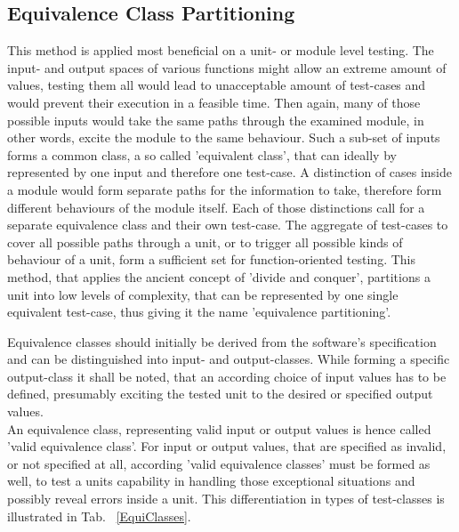 	\subsection{Equivalence Class Partitioning}
	This method is applied most beneficial on a unit- or module level testing. The input- and output spaces of various functions might allow an extreme amount of values, testing them all would lead to unacceptable amount of test-cases and would prevent their execution in a feasible time. Then again, many of those possible inputs would take the same paths through the examined module, in other words, excite the module to the same behaviour. Such a sub-set of inputs forms a common class, a so called 'equivalent class', that can ideally by represented by one input and therefore one test-case. A distinction of cases inside a module would form separate paths for the information to take, therefore form different behaviours of the module itself. Each of those distinctions call for a separate equivalence class and their own test-case. The aggregate of test-cases to cover all possible paths through a unit, or to trigger all possible kinds of behaviour of a unit, form a sufficient set for function-oriented testing. This method, that applies the ancient concept of 'divide and conquer', partitions a unit into low levels of complexity, that can be represented by one single equivalent test-case, thus giving it the name 'equivalence partitioning'.

	Equivalence classes should initially be derived from the software's specification and can be distinguished into input- and output-classes. While forming a specific output-class it shall be noted, that an according choice of input values has to be defined, presumably exciting the tested unit to the desired or specified output values. \\
	An equivalence class, representing valid input or output values is hence called 'valid equivalence class'. For input or output values, that are specified as invalid, or not specified at all, according 'valid equivalence classes' must be formed as well, to test a units capability in handling those exceptional situations and possibly reveal errors inside a unit. This differentiation in types of test-classes is illustrated in Tab. ~\ref{EquiClasses}.
	
